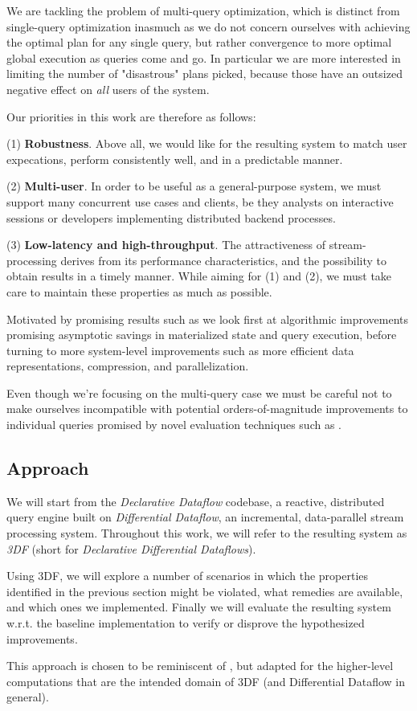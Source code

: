 \documentclass[../index.tex]{subfiles}
\begin{document}
We are tackling the problem of multi-query optimization, which is
distinct from single-query optimization inasmuch as we do not concern
ourselves with achieving the optimal plan for any single query, but
rather convergence to more optimal global execution as queries come
and go. In particular we are more interested in limiting the number of
"disastrous" plans picked, because those have an outsized negative
effect on \emph{all} users of the system.

Our priorities in this work are therefore as follows:

(1) \textbf{Robustness}. Above all, we would like for the resulting system
to match user expecations, perform consistently well, and in a
predictable manner.

(2) \textbf{Multi-user}. In order to be useful as a general-purpose system,
we must support many concurrent use cases and clients, be they
analysts on interactive sessions or developers implementing
distributed backend processes.

(3) \textbf{Low-latency and high-throughput}. The attractiveness of
stream-processing derives from its performance characteristics, and
the possibility to obtain results in a timely manner. While aiming for
(1) and (2), we must take care to maintain these properties as much as
possible.

Motivated by promising results such as \cite{aref2015design} we look
first at algorithmic improvements promising asymptotic savings in
materialized state and query execution, before turning to more
system-level improvements such as more efficient data representations,
compression, and parallelization.

Even though we're focusing on the multi-query case we must be careful
not to make ourselves incompatible with potential orders-of-magnitude
improvements to individual queries promised by novel evaluation
techniques such as \cite{tekle2011more}.

\subsection{Approach}

We will start from the \emph{Declarative Dataflow} codebase, a
reactive, distributed query engine built on \emph{Differential
  Dataflow}, an incremental, data-parallel stream processing
system. Throughout this work, we will refer to the resulting system as
\emph{3DF} (short for \emph{Declarative Differential Dataflows}).

Using 3DF, we will explore a number of scenarios in which the
properties identified in the previous section might be violated, what
remedies are available, and which ones we implemented. Finally we will
evaluate the resulting system w.r.t. the baseline implementation to
verify or disprove the hypothesized improvements.

This approach is chosen to be reminiscent of \cite{hirzel2014catalog},
but adapted for the higher-level computations that are the intended
domain of 3DF (and Differential Dataflow in general).
\end{document}
